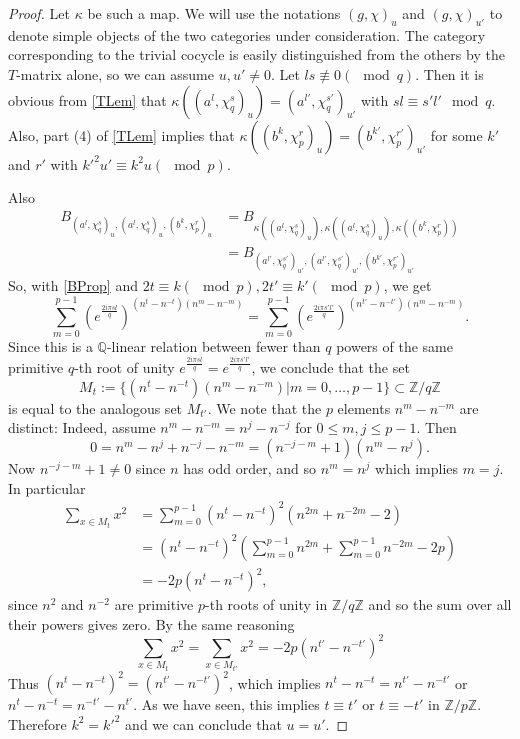 \documentclass[11pt]{book}
\theoremstyle{Rem}
\theoremstyle{definition}
\numberwithin{equation}{section}
\newcommand\ZZ{\mathbb Z}
\begin{document}
\begin{proof}
  Let $\kappa$ be such a map. We will use the notations $(g,\chi)_u$ and $(g,\chi)_{u'}$ to denote simple objects of the two categories under consideration. The category corresponding to the trivial cocycle is easily distinguished from the others by the $T$-matrix alone, so we can assume $u,u'\neq 0$. Let $ls\not\equiv 0(\mod q)$. Then it is obvious from \cref{TLem} that $\kappa((a^l,\chi_q^s)_u)=(a^{l'},\chi_q^{s'})_{u'}$ with $sl \equiv s'l' \mod q$. Also, part (4) of \ref{TLem} implies that $\kappa((b^k,\chi_p^r)_u)=(b^{k'},\chi_p^{r'})_{u'}$ for some $k'$ and $r'$ with $k'^2u'\equiv k^2u(\mod p)$.

Also
\begin{align*}
B_{(a^l,\chi_q^s)_u,(a^l, \chi_q^s)_u,(b^k, \chi_p^r)_u} &= B_{\kappa((a^l,\chi_q^s)_u),\kappa((a^l, \chi_q^s)_u),\kappa((b^k, \chi_p^r))}\\
&= B_{(a^{l'},\chi_q^{s'})_{u'},(a^{l'},\chi_q^{s'})_{u'},(b^{k'}, \chi_p^{r'})_{u'}}
\end{align*}
So, with \cref{BProp} and $2t\equiv k(\mod p), 2t'\equiv k'(\mod p)$, we get
\begin{equation}\label{sumroots}
\sum_{m=0}^{p-1} \left(e^{\frac{2i\pi sl} {q} }\right)^{(n^t-n^{-t})(n^{m}-n^{-m})} = \sum_{m=0}^{p-1} \left(e^{\frac{2i\pi s'l'} {q} }\right)^{(n^{t'}-n^{-t'})(n^{m}-n^{-m})}.
\end{equation}
Since this is a $\mathbb Q$-linear relation between fewer than $q$ powers of the same primitive $q$-th root of unity $e^{\frac{2i\pi sl} {q} }=e^{\frac{2i\pi s'l'} {q}}$, we conclude that the set 
\begin{equation*}
  M_t:=\{(n^t-n^{-t})(n^{m}-n^{-m})|m=0,\dots,p-1\}\subset\ZZ/q\ZZ
\end{equation*}
is equal to the analogous set $M_{t'}$. We note that the $p$ elements $n^m-n^{-m}$ are distinct: Indeed, assume $n^m-n^{-m}=n^j-n^{-j}$ for $0\leq m,j\leq p-1$. Then
  \begin{equation*}
    0=n^m-n^j+n^{-j}-n^{-m}=(n^{-j-m}+1)(n^m-n^j).
  \end{equation*}
 Now $n^{-j-m}+1\neq 0$ since $n$ has odd order, and so $n^m=n^j$ which implies $m=j$. In particular
\begin{align*}
  \sum_{x\in M_t}x^2&=\sum_{m=0}^{p-1}(n^{t}-n^{-t})^2(n^{2m}+n^{-2m}-2)\\
                  &=(n^{t}-n^{-t})^2\left(\sum_{m=0}^{p-1}n^{2m}+\sum_{m=0}^{p-1}n^{-2m}-2p\right)\\
  &=-2p(n^{t}-n^{-t})^2,
\end{align*}
since $n^2$ and $n^{-2}$ are primitive $p$-th roots of unity in $\ZZ/q\ZZ$
and so the sum over all their powers gives zero. By the same reasoning
\begin{equation*}
  \sum_{x\in M_t}x^2=\sum_{x\in M_{t'}}x^2=-2p(n^{t'}-n^{-t'})^2
\end{equation*}
Thus $(n^t-n^{-t})^2=(n^{t'}-n^{-t'})^2$, which implies $n^t-n^{-t}=n^{t'}-n^{-t'}$ or $n^t-n^{-t}=n^{-t'}-n^{t'}$. As we have seen, this implies $t\equiv t'$ or $t\equiv -t'$ in $\ZZ/p\ZZ$. Therefore $k^2=k'^2$ and we can conclude that $u=u'$.
\end{proof}
\end{document}
